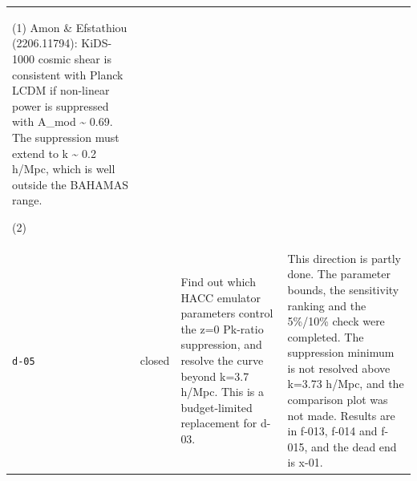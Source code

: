 \documentclass[11pt,a4paper]{article}
\begin{document}
\begin{longtable}{@{}p{}p{}p{}p{}@{}}
(1) Amon \& Efstathiou (2206.11794): KiDS-1000 cosmic shear is consistent with Planck LCDM if non-linear power is suppressed with A\_mod \textasciitilde{} 0.69. The suppression must extend to k \textasciitilde{} 0.2 h/Mpc, which is well outside the BAHAMAS range.

(2)  \\
\texttt{d-05} & closed & Find out which HACC emulator parameters control the z=0 Pk-ratio suppression, and resolve the curve beyond k=3.7 h/Mpc. This is a budget-limited replacement for d-03. & This direction is partly done. The parameter bounds, the sensitivity ranking and the 5\%/10\% check were completed. The suppression minimum is not resolved above k=3.73 h/Mpc, and the comparison plot was not made. Results are in f-013, f-014 and f-015, and the dead end is x-01.


\end{longtable}
\end{document}
